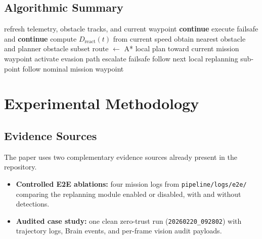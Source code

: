 \documentclass[a4paper,11pt]{article}
\begin{document}
\subsection{Algorithmic Summary}

\begin{algorithm}[t]
    \caption{Simplified control loop for the proposed method integrated in Pipeline A}
    \label{alg:replanner}
    \small
    \begin{algorithmic}[1]
            \State refresh telemetry, obstacle tracks, and current waypoint
                \State \textbf{continue}
            \EndIf
                \State execute failsafe and \textbf{continue}
            \EndIf
            \State compute \(D_{\mathrm{react}}(t)\) from current speed
            \State obtain nearest obstacle and planner obstacle subset
                \State route \(\gets\) A* local plan toward current mission waypoint
                    \State activate evasion path
                \Else
                    \State escalate failsafe
                \EndIf
            \EndIf
                \State follow next local replanning sub-point
            \Else
                \State follow nominal mission waypoint
            \EndIf
        \EndWhile
    \end{algorithmic}
\end{algorithm}

\section{Experimental Methodology}

\subsection{Evidence Sources}

The paper uses two complementary evidence sources already present in the repository.
\begin{itemize}[leftmargin=1.3em]
    \item \textbf{Controlled E2E ablations:} four mission logs from \texttt{pipeline/logs/e2e/} comparing the replanning module enabled or disabled, with and without detections.
    \item \textbf{Audited case study:} one clean zero-trust run (\texttt{20260220\_092802}) with trajectory logs, Brain events, and per-frame vision audit payloads.
\end{itemize}
\end{document}
